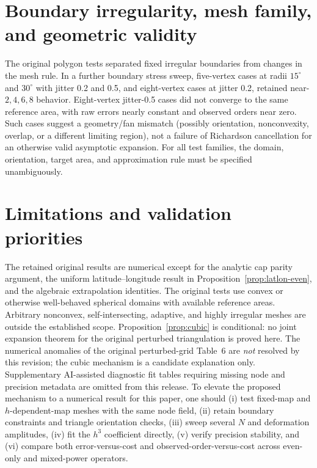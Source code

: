 \documentclass[11pt]{article}
\theoremstyle{remark}
\begin{document}
\section{Boundary irregularity, mesh family, and geometric validity}
The original polygon tests separated fixed irregular boundaries from changes in the mesh rule.
In a further boundary stress sweep, five-vertex cases at radii $15^\circ$ and $30^\circ$ with
jitter 0.2 and 0.5, and eight-vertex cases at jitter 0.2, retained near-$2,4,6,8$ behavior.
Eight-vertex jitter-0.5 cases did not converge to the same reference area, with raw errors
nearly constant and observed orders near zero. Such cases suggest a geometry/fan mismatch
(possibly orientation, nonconvexity, overlap, or a different limiting region), not a failure of
Richardson cancellation for an otherwise valid asymptotic expansion. For all test families, the
domain, orientation, target area, and approximation rule must be specified unambiguously.

\section{Limitations and validation priorities}
The retained original results are numerical except for the analytic cap parity argument,
the uniform latitude--longitude result in Proposition~\ref{prop:latlon-even}, and the
algebraic extrapolation identities. The original tests use convex or otherwise well-behaved
spherical domains with available reference areas. Arbitrary nonconvex, self-intersecting,
adaptive, and highly irregular meshes are outside the established scope. Proposition~\ref{prop:cubic} is
conditional: no joint expansion theorem for the original perturbed triangulation is proved
here. The numerical anomalies of the original perturbed-grid Table~6 are \emph{not} resolved by this revision;
the cubic mechanism is a candidate explanation only. Supplementary AI-assisted diagnostic fit tables requiring missing node and precision metadata are omitted from this release. To
elevate the proposed mechanism to a numerical result for this paper, one should (i) test
fixed-map and $h$-dependent-map meshes with the same node field, (ii) retain boundary
constraints and triangle orientation checks, (iii) sweep several $N$ and deformation
amplitudes, (iv) fit the $h^3$ coefficient directly, (v) verify precision stability, and
(vi) compare both error-versus-cost and observed-order-versus-cost across even-only and
mixed-power operators.
\end{document}
